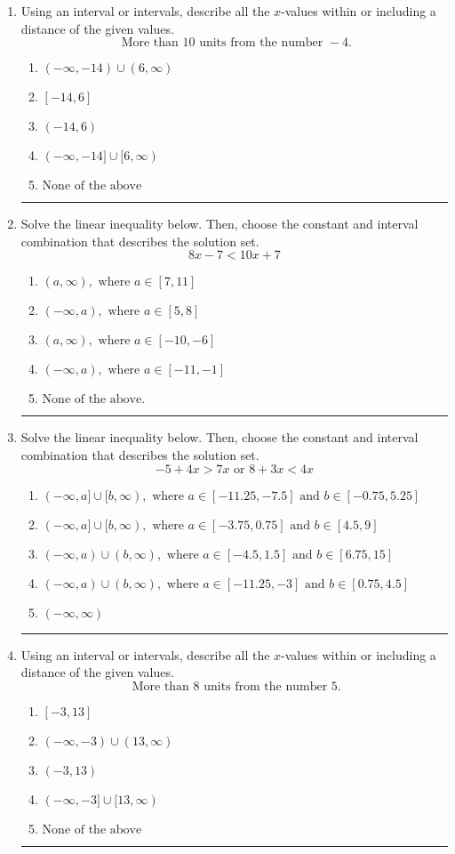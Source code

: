\documentclass[14pt]{extbook}
\newcommand{\litem}[1]{\item#1\hspace*{-1cm}\rule{\textwidth}{0.4pt}}
\begin{document}
\begin{enumerate}
{\begin{enumerate}[label=\Alph*.]
\end{enumerate} }
\litem{
Using an interval or intervals, describe all the $x$-values within or including a distance of the given values.\[ \text{ More than } 10 \text{ units from the number } -4. \]\begin{enumerate}[label=\Alph*.]
\item \( (-\infty, -14) \cup (6, \infty) \)
\item \( [-14, 6] \)
\item \( (-14, 6) \)
\item \( (-\infty, -14] \cup [6, \infty) \)
\item \( \text{None of the above} \)

\end{enumerate} }
\litem{
Solve the linear inequality below. Then, choose the constant and interval combination that describes the solution set.\[ 8x -7 < 10x + 7 \]\begin{enumerate}[label=\Alph*.]
\item \( (a, \infty), \text{ where } a \in [7, 11] \)
\item \( (-\infty, a), \text{ where } a \in [5, 8] \)
\item \( (a, \infty), \text{ where } a \in [-10, -6] \)
\item \( (-\infty, a), \text{ where } a \in [-11, -1] \)
\item \( \text{None of the above}. \)

\end{enumerate} }
\litem{
Solve the linear inequality below. Then, choose the constant and interval combination that describes the solution set.\[ -5 + 4 x > 7 x \text{ or } 8 + 3 x < 4 x \]\begin{enumerate}[label=\Alph*.]
\item \( (-\infty, a] \cup [b, \infty), \text{ where } a \in [-11.25, -7.5] \text{ and } b \in [-0.75, 5.25] \)
\item \( (-\infty, a] \cup [b, \infty), \text{ where } a \in [-3.75, 0.75] \text{ and } b \in [4.5, 9] \)
\item \( (-\infty, a) \cup (b, \infty), \text{ where } a \in [-4.5, 1.5] \text{ and } b \in [6.75, 15] \)
\item \( (-\infty, a) \cup (b, \infty), \text{ where } a \in [-11.25, -3] \text{ and } b \in [0.75, 4.5] \)
\item \( (-\infty, \infty) \)

\end{enumerate} }
\litem{
Using an interval or intervals, describe all the $x$-values within or including a distance of the given values.\[ \text{ More than } 8 \text{ units from the number } 5. \]\begin{enumerate}[label=\Alph*.]
\item \( [-3, 13] \)
\item \( (-\infty, -3) \cup (13, \infty) \)
\item \( (-3, 13) \)
\item \( (-\infty, -3] \cup [13, \infty) \)
\item \( \text{None of the above} \)


\end{enumerate}}
\end{enumerate}
\end{document}
